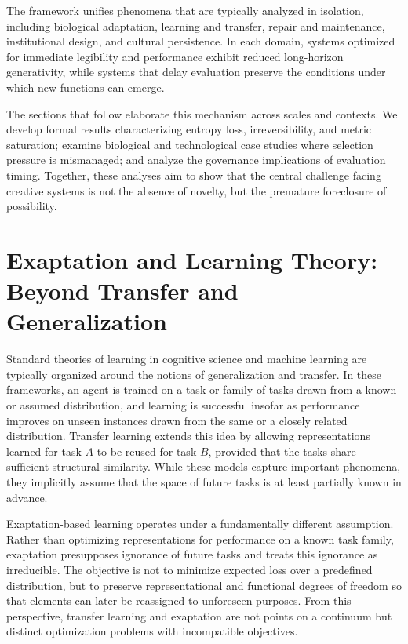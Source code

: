 \documentclass[11pt]{article}
\theoremstyle{definition}
\begin{document}
The framework unifies phenomena that are typically analyzed in isolation, including biological adaptation, learning and transfer, repair and maintenance, institutional design, and cultural persistence. In each domain, systems optimized for immediate legibility and performance exhibit reduced long-horizon generativity, while systems that delay evaluation preserve the conditions under which new functions can emerge.

The sections that follow elaborate this mechanism across scales and contexts. We develop formal results characterizing entropy loss, irreversibility, and metric saturation; examine biological and technological case studies where selection pressure is mismanaged; and analyze the governance implications of evaluation timing. Together, these analyses aim to show that the central challenge facing creative systems is not the absence of novelty, but the premature foreclosure of possibility.

\section{Exaptation and Learning Theory: Beyond Transfer and Generalization}

Standard theories of learning in cognitive science and machine learning are typically organized around the notions of generalization and transfer. In these frameworks, an agent is trained on a task or family of tasks drawn from a known or assumed distribution, and learning is successful insofar as performance improves on unseen instances drawn from the same or a closely related distribution. Transfer learning extends this idea by allowing representations learned for task $A$ to be reused for task $B$, provided that the tasks share sufficient structural similarity. While these models capture important phenomena, they implicitly assume that the space of future tasks is at least partially known in advance.

Exaptation-based learning operates under a fundamentally different assumption. Rather than optimizing representations for performance on a known task family, exaptation presupposes ignorance of future tasks and treats this ignorance as irreducible. The objective is not to minimize expected loss over a predefined distribution, but to preserve representational and functional degrees of freedom so that elements can later be reassigned to unforeseen purposes. From this perspective, transfer learning and exaptation are not points on a continuum but distinct optimization problems with incompatible objectives.
\end{document}
